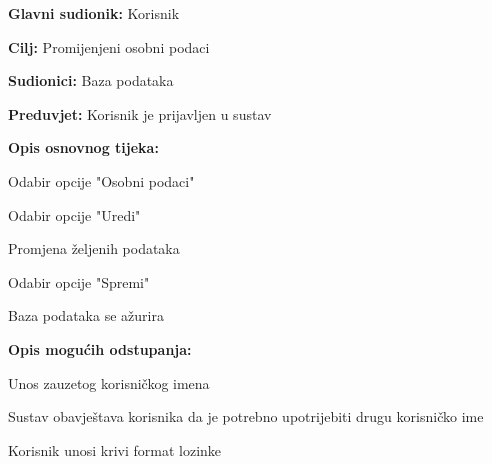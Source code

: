 					\noindent {}
					\begin{packed_item}
						
						\item \textbf{Glavni sudionik: }Korisnik
						\item  \textbf{Cilj:} Promijenjeni osobni podaci
						\item  \textbf{Sudionici:} Baza podataka
						\item  \textbf{Preduvjet:} Korisnik je prijavljen u sustav
						\item  \textbf{Opis osnovnog tijeka:}
						
						\item[] \begin{packed_enum}
							
							\item Odabir opcije "Osobni podaci"
							\item Odabir opcije "Uredi"
							\item Promjena željenih podataka
							\item Odabir opcije "Spremi"
							\item Baza podataka se ažurira
							
						\end{packed_enum}
						
						\item  \textbf{Opis mogućih odstupanja:}
						
						\item[] \begin{packed_item}
							
							\item[3.a] Unos zauzetog korisničkog imena
							\item[] \begin{packed_enum}
								
								\item Sustav obavještava korisnika da je potrebno upotrijebiti drugu korisničko ime
								
							\end{packed_enum}
							
						\end{packed_item}
						
						\item[] \begin{packed_item}
							
							\item[3.b] Korisnik unosi krivi format lozinke
							\item[] \begin{packed_enum}
								

\end{packed_enum}
\end{packed_item}
\end{packed_item}
